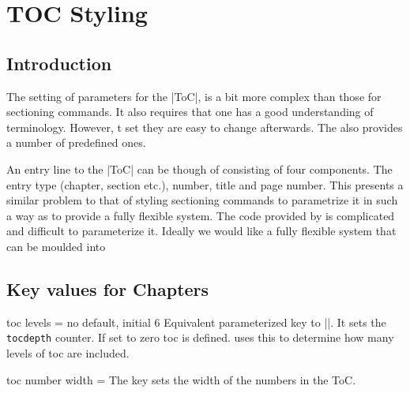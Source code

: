 
\chapter{TOC Styling}
\label{ch:toc}




\section{Introduction}

The setting of parameters for the |ToC|, is a bit more complex than those for sectioning commands. It also requires that one has a good understanding of \latexe terminology. However, t set they are easy to change afterwards.
The  also provides a number of predefined ones.

An entry line to the |ToC| can be though of consisting of four components. The entry type (chapter, section etc.), number, title and page number. This presents a similar problem to that of styling sectioning commands to parametrize it in such a way as to provide a fully flexible system. The code provided by \latexe is complicated and difficult to parameterize it. Ideally we would like a fully flexible system that can be moulded into  



\section{Key values for Chapters}


\begin{docKey}[phd]{toc levels}{ =  } {no default, initial 6}
 Equivalent parameterized key to |\toclevel|. It sets  the \texttt{tocdepth} counter. 
 If set to zero toc is defined. \latex uses this to determine how many levels of toc are included.
\end{docKey}

\begin{docKey}[phd]{toc number width}{ = }{}
The key sets the width of the numbers in the ToC. 
\end{docKey}

